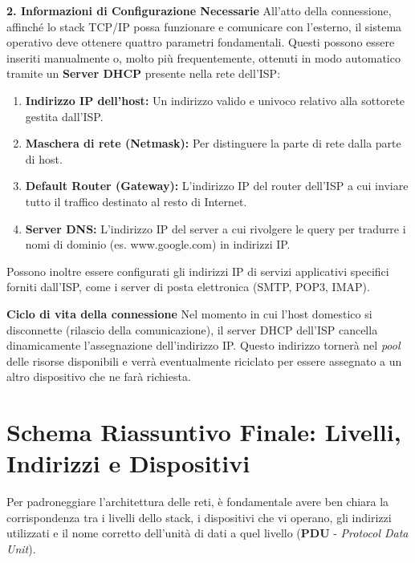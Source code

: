 \documentclass[a4paper,12pt]{report}
\begin{document}
\vspace{0.3cm}
\textbf{2. Informazioni di Configurazione Necessarie}
All'atto della connessione, affinché lo stack TCP/IP possa funzionare e comunicare con l'esterno, il sistema operativo deve ottenere quattro parametri fondamentali. Questi possono essere inseriti manualmente o, molto più frequentemente, ottenuti in modo automatico tramite un \textbf{Server DHCP} presente nella rete dell'ISP:

\begin{enumerate}[leftmargin=*]
    \item \textbf{Indirizzo IP dell'host:} Un indirizzo valido e univoco relativo alla sottorete gestita dall'ISP.
    \item \textbf{Maschera di rete (Netmask):} Per distinguere la parte di rete dalla parte di host.
    \item \textbf{Default Router (Gateway):} L'indirizzo IP del router dell'ISP a cui inviare tutto il traffico destinato al resto di Internet.
    \item \textbf{Server DNS:} L'indirizzo IP del server a cui rivolgere le query per tradurre i nomi di dominio (es. www.google.com) in indirizzi IP.
\end{enumerate}

Possono inoltre essere configurati gli indirizzi IP di servizi applicativi specifici forniti dall'ISP, come i server di posta elettronica (SMTP, POP3, IMAP).

\begin{notebox}{\textbf{Ciclo di vita della connessione}}
Nel momento in cui l'host domestico si disconnette (rilascio della comunicazione), il server DHCP dell'ISP cancella dinamicamente l'assegnazione dell'indirizzo IP. Questo indirizzo tornerà nel \textit{pool} delle risorse disponibili e verrà eventualmente riciclato per essere assegnato a un altro dispositivo che ne farà richiesta.
\end{notebox}

\section{Schema Riassuntivo Finale: Livelli, Indirizzi e Dispositivi}

Per padroneggiare l'architettura delle reti, è fondamentale avere ben chiara la corrispondenza tra i livelli dello stack, i dispositivi che vi operano, gli indirizzi utilizzati e il nome corretto dell'unità di dati a quel livello (\textbf{PDU} - \textit{Protocol Data Unit}).
\end{document}
